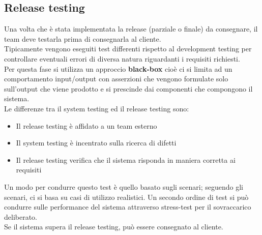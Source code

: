 \subsection{Release testing}
Una volta che è stata implementata la release (parziale o finale) da consegnare, il team deve testarla prima di consegnarla al cliente.\\ Tipicamente vengono eseguiti test differenti rispetto al development testing per controllare eventuali errori di diversa natura riguardanti i requisiti richiesti.\\
Per questa fase si utilizza un approccio \textbf{black-box} cioè ci si limita ad un comportamento input/output con asserzioni che vengono formulate solo sull'output che viene prodotto e si prescinde dai componenti che compongono il sistema.\\
Le differenze tra il system testing ed il release testing sono:
\begin{itemize}[noitemsep]
    \item Il release testing è affidato a un team esterno
    \item Il system testing è incentrato sulla ricerca di difetti
    \item Il release testing verifica che il sistema risponda in maniera corretta ai requisiti
\end{itemize}
Un modo per condurre questo test è quello basato sugli scenari; seguendo gli scenari, ci si basa su casi di utilizzo realistici.
Un secondo ordine di test si può condurre sulle performance del sistema attraverso stress-test per il sovraccarico deliberato.\\
Se il sistema supera il release testing, può essere consegnato al cliente.

